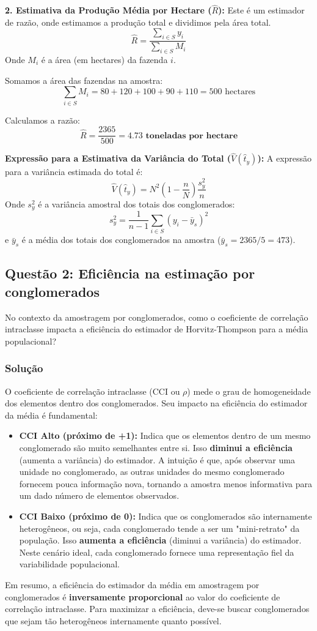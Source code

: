 \documentclass{article}
\begin{document}
\textbf{2. Estimativa da Produção Média por Hectare ($\hat{R}$):}
Este é um estimador de razão, onde estimamos a produção total e dividimos pela área total.
\[ \hat{R} = \frac{\sum_{i \in S} y_i}{\sum_{i \in S} M_i} \]
Onde $M_i$ é a área (em hectares) da fazenda $i$.

Somamos a área das fazendas na amostra:
\[ \sum_{i \in S} M_i = 80 + 120 + 100 + 90 + 110 = 500 \text{ hectares} \]

Calculamos a razão:
\[ \hat{R} = \frac{2365}{500} = \mathbf{4.73 \textbf{ toneladas por hectare}} \]

\textbf{Expressão para a Estimativa da Variância do Total ($\hat{V}(\hat{t}_y)$):}
A expressão para a variância estimada do total é:
\[ \hat{V}(\hat{t}_y) = N^2 \left(1 - \frac{n}{N}\right) \frac{s_y^2}{n} \]
Onde $s_y^2$ é a variância amostral dos totais dos conglomerados:
\[ s_y^2 = \frac{1}{n-1} \sum_{i \in S} (y_i - \bar{y}_s)^2 \]
e $\bar{y}_s$ é a média dos totais dos conglomerados na amostra ($\bar{y}_s = 2365/5 = 473$).

\hrulefill
\subsection*{Questão 2: Eficiência na estimação por conglomerados}
No contexto da amostragem por conglomerados, como o coeficiente de correlação intraclasse impacta a eficiência do estimador de Horvitz-Thompson para a média populacional?

\subsubsection*{Solução}
O coeficiente de correlação intraclasse (CCI ou $\rho$) mede o grau de homogeneidade dos elementos dentro dos conglomerados. Seu impacto na eficiência do estimador da média é fundamental:
\begin{itemize}
    \item \textbf{CCI Alto (próximo de +1):} Indica que os elementos dentro de um mesmo conglomerado são muito semelhantes entre si. Isso \textbf{diminui a eficiência} (aumenta a variância) do estimador. A intuição é que, após observar uma unidade no conglomerado, as outras unidades do mesmo conglomerado fornecem pouca informação nova, tornando a amostra menos informativa para um dado número de elementos observados.
    \item \textbf{CCI Baixo (próximo de 0):} Indica que os conglomerados são internamente heterogêneos, ou seja, cada conglomerado tende a ser um "mini-retrato" da população. Isso \textbf{aumenta a eficiência} (diminui a variância) do estimador. Neste cenário ideal, cada conglomerado fornece uma representação fiel da variabilidade populacional.
\end{itemize}
Em resumo, a eficiência do estimador da média em amostragem por conglomerados é \textbf{inversamente proporcional} ao valor do coeficiente de correlação intraclasse. Para maximizar a eficiência, deve-se buscar conglomerados que sejam tão heterogêneos internamente quanto possível.
\end{document}
